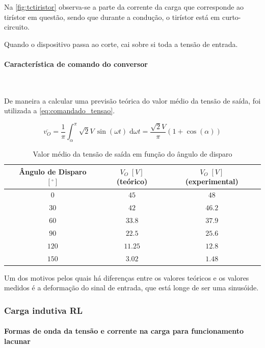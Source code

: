 \documentclass[a4paper,11pt]{article}
\numberwithin{equation}{section}
\begin{document}
Na \autoref{fig:tctiristor} observa-se a parte da corrente da carga que corresponde ao tirístor em questão, sendo que durante a condução, o tirístor está em curto-circuito.

Quando o dispositivo passa ao corte, cai sobre si toda a tensão de entrada.

\paragraph{Característica de comando do conversor} \mbox{}\

De maneira a calcular uma previsão teórica do valor médio da tensão de saída, foi utilizada a \autoref{eq:comandado_tensao}.

\begin{equation}
\label{eq:comandado_tensao}
\overline{v_O}=\frac{1}{\pi} \int_\alpha^\pi \sqrt{2} V \,\sin{(\omega t)}\;\mathrm{d}\omega t = \frac{\sqrt{2}V}{\pi}(1 + \cos{(\alpha)})
\end{equation}

\begin{table}[H]
\centering
\begin{tabular}{c c c c c c c}
\hfil & Ângulo de Disparo $[^\circ]$ & \hfil & $V_O\;[V]$ (teórico) & \hfil & $V_O\;[V]$ (experimental) & \hfil \\
\hline
			&$0$&	&$45$&		&$48$&\\
\rowcolor{SkyBlue}	&$30$&	&$42$&		&$46.2$&\\
			&$60$&	&$33.8$&	&$37.9$&\\
\rowcolor{SkyBlue}	&$90$&	&$22.5$&	&$25.6$&\\
			&$120$&	&$11.25$&	&$12.8$&\\
\rowcolor{SkyBlue}	&$150$&	&$3.02$&	&$1.48$&\\
\hline
\end{tabular}
\caption{Valor médio da tensão de saída em função do ângulo de disparo}
\label{tab:akpk}
\end{table}

Um dos motivos pelos quais há diferenças entre os valores teóricos e os valores medidos é a deformação do sinal de entrada, que está longe de ser uma sinusóide.

\subsubsection{Carga indutiva RL}

\paragraph{Formas de onda da tensão e corrente na carga para funcionamento lacunar} \mbox{}\
\end{document}
